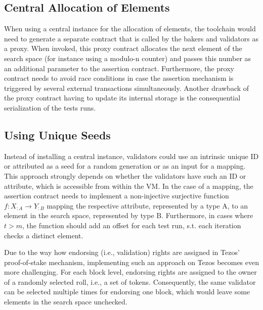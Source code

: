 \subsection{Central Allocation of Elements}
When using a central instance for the allocation of elements, the toolchain would need to generate a separate contract that is called by the bakers and validators as a proxy. When invoked, this proxy contract allocates the next element of the search space (for instance using a modulo-n counter) and passes this number as an additional parameter to the assertion contract. Furthermore, the proxy contract needs to avoid race conditions in case the assertion mechanism is triggered by several external transactions simultaneously. Another drawback of the proxy contract having to update its internal storage is the consequential serialization of the tests runs.

\subsection{Using Unique Seeds}\label{sec:alt_attributes}
Instead of installing a central instance, validators could use an intrinsic unique ID or attributed as a seed for a random generation or as an input for a mapping. This approach strongly depends on whether the validators have such an ID or attribute, which is accessible from within the VM. In the case of a mapping, the assertion contract needs to implement a non-injective surjective function $f: X_{:A} \rightarrow Y_{:B}$ mapping the respective attribute, represented by a type A, to an element in the search space, represented by type B. Furthermore, in cases where $t > m$, the function should add an offset for each test run, s.t. each iteration checks a distinct element.

Due to the way how endorsing (i.e., validation) rights are assigned in Tezos' proof-of-stake mechanism, implementing such an approach on Tezos becomes even more challenging. For each block level, endorsing rights are assigned to the owner of a randomly selected roll, i.e., a set of tokens. Consequently, the same validator can be selected multiple times for endorsing one block, which would leave some elements in the search space unchecked.